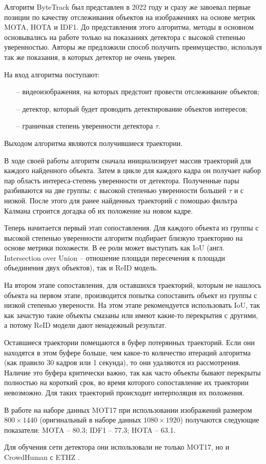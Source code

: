 Алгоритм ByteTrack \cite{zhang2022bytetrack} был представлен в 2022 году и сразу же завоевал первые позиции по качеству отслеживания объектов на изображениях на основе метрик MOTA, HOTA и IDF1.
До представления этого алгоритма, методы в основном основывались на работе только на показаниях детектора с высокой степенью уверенностью. Авторы же предложили способ получить преимущество, используя так же показания, в которых детектор не очень уверен.

На вход алгоритма поступают:
\begin{itemize}
    \item[--] видеоизображения, на которых предстоит провести отслеживание объектов;
    \item[--] детектор, который будет проводить детектирование объектов интересов;
    \item[--] граничная степень уверенности детектора \(\tau\). 
\end{itemize}
Выходом алгоритма являются получившиеся траектории. 

В ходе своей работы алгоритм сначала инициализирует массив траекторий для каждого найденного объекта. 
Затем в цикле для каждого кадра он получает набор пар область интереса-степень уверенности от детектора.
Полученные пары разбиваются на две группы: с высокой степенью уверенности большей \(\tau\) и с низкой. 
После этого для ранее найденных траекторий с помощью фильтра Калмана строится догадка об их положение на новом кадре.

Теперь начитается первый этап сопоставления. Для каждого объекта из группы с высокой степенью уверенности алгоритм подбирает близкую траекторию на основе метрики похожести. В ее роли может выступать как IoU (англ. Intersection over Union -- отношение площади пересечения к площади объединения двух объектов), так и ReID модель. 

На втором этапе сопоставления, для оставшихся траекторий, которым не нашлось объекта на первом этапе, производится попытка сопоставить объект из группы с низкой степенью уверености. На этом этапе рекомендуется использовать IoU, так как зачастую такие объекты смазаны или имеют какие-то перекрытия с другими, а потому ReID модели дают ненадежный результат.

Оставшиеся траектории помещаются в буфер потерянных траекторий. Если они находятся в этом буфере больше, чем какое-то количество итераций алгоритма (как правило 30 кадров или 1 секунда), то они удаляются из рассмотрения. Наличие это буфера критически важно, так как часто объекты бывают перекрыты полностью на короткий срок, во время которого сопоставление их траектории невозможно. Для таких траекторий происходит интерполяция их положения.

В работе на наборе данных MOT17 при использовании изображений размером \(800 \times 1440\) (оригинальный в наборе данных \(1080 \times 1920\)) получаются следующие показатели: MOTA -- 80.3; IDF1 -- 77.3; HOTA -- 63.1.

Для обучения сети детектора они использовали не только MOT17, но и CrowdHuman \cite{shao2018crowdhuman} с ETHZ \cite{ess2008mobile}.

